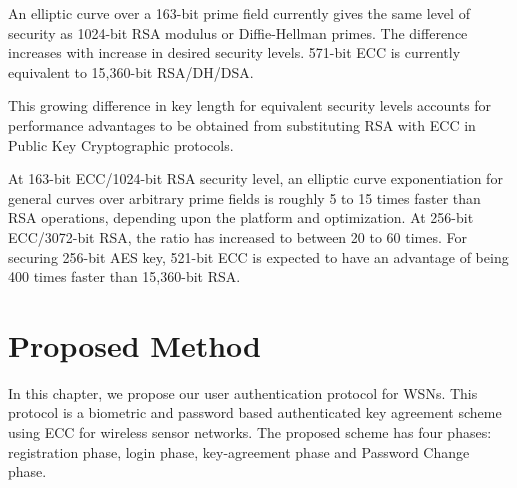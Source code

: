 \documentclass[a4paper,12pt]{report}
\begin{document}
\begin{table}[h]
\centering
{}
\caption{Table showing key sizes for equivalent security levels.\cite{eccadv}}
\end{table}
An elliptic curve over a 163-bit prime field currently gives the
same level of security as 1024-bit RSA modulus or Diffie-Hellman
primes. The difference increases with increase in desired security
levels. 571-bit ECC is currently equivalent to 15,360-bit
RSA/DH/DSA.

This growing difference in key length for equivalent security levels
accounts for performance advantages to be obtained from substituting
RSA with ECC in Public Key Cryptographic protocols.


At 163-bit ECC/1024-bit RSA security level, an elliptic curve
exponentiation for general curves over arbitrary prime fields is
roughly 5 to 15 times faster than RSA operations, depending upon the
platform and optimization. At 256-bit ECC/3072-bit RSA, the ratio
has increased to between 20 to 60 times. For securing 256-bit AES
key, 521-bit ECC is expected to have an advantage of being 400 times
faster than 15,360-bit RSA.

\begin{table}[h]
\centering
{}
\caption{Sample Elliptic curve exponentiation and RSA timings(\textit{in milliseconds}).\cite{eccadv}}
\end{table}

\afterpage{\null\newpage}




\chapter{Proposed Method}
\label{Ch4} In this chapter, we propose our user authentication
protocol for WSNs. This protocol is a biometric and password based
authenticated key agreement scheme using ECC for wireless sensor
networks. The proposed scheme has four phases: registration phase,
login phase, key-agreement phase and Password Change phase.
\end{document}

